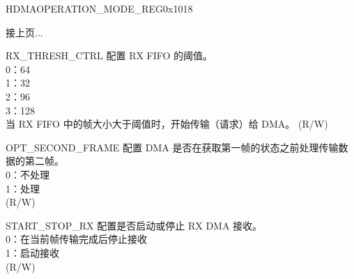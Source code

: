 \begin{register}{H}{DMAOPERATION\_MODE\_REG}{0x1018}
\begin{regdesc}\begin{reglist}
\item[接上页...]

\item [RX\_THRESH\_CTRL] 配置 RX FIFO 的阈值。\\
0：64\\
1：32\\
2：96\\
3：128\\
当 RX FIFO 中的帧大小大于阈值时，开始传输（请求）给 DMA。
(R/W)
\item [OPT\_SECOND\_FRAME] 配置 DMA 是否在获取第一帧的状态之前处理传输数据的第二帧。\\
0：不处理\\
1：处理\\ (R/W)
\item [START\_STOP\_RX] 配置是否启动或停止 RX DMA 接收。\\
0：在当前帧传输完成后停止接收\\
1：启动接收\\(R/W)
\end{reglist}\end{regdesc}
\end{register}

